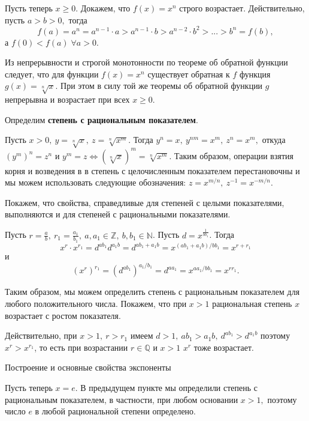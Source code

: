 Пусть теперь $x\geq 0.$
Докажем, что $f(x)=x^n$ строго возрастает.
Действительно, пусть $a>b>0,$ тогда
$$
    f(a)=a^n=a^{n-1} \cdot a > a^{n-1}
    \cdot b > a^{n-2} \cdot b^2 > ... > b^n=f(b),
$$
а $f(0)<f(a)\;\forall a>0.$

Из непрерывности и строгой
монотонности по теореме об обратной функции следует,
что для функции $f(x)=x^n$ существует обратная к $f$
функция $g(x) = \sqrt[n]{x}.$ При этом в силу той же
теоремы об обратной функции $g$ непрерывна и возрастает
при всех $x\geq0.$

Определим \textbf{степень с рациональным показателем}.

Пусть $x>0, \ y = \sqrt[n]x, \ z = \sqrt[n]{x^m}$.
Тогда
$y^n = x, \ y^{nm} = x^m, \ z^n = x^m,$
откуда $(y^m)^n = z^n$ и
$y^m = z \iff (\sqrt[n]x)^m = \sqrt[n]{x^m}.$
Таким образом, операции взятия корня
и возведения в в степень с целочисленным
показателем перестановочны и мы можем использовать
следующие обозначения:
$z = x^{m/n}, \ z^{-1} = x^{-m/n}.$

Покажем, что свойства, справедливые
для степеней с целыми показателями, выполняются
и для степеней с рациональными показателями.

Пусть $r = \frac{a}{b}, \ r_1 = \frac{a_1}{b_1},
    \ a, a_1 \in \mathbb Z, \ b, b_1 \in \mathbb N$.
Пусть $d = x^{\frac{1}{bb_1}}$. Тогда
$$
    x^r \cdot x^{r_1} = d^{ab_1} d^{a_1b} =
    d^{ab_1+a_1b} = x^{(ab_1+a_1b)/bb_1} = x^{r+r_1}
$$
и
$$
    (x^r)^{r_1} = (d^{ab_1})^{a_1/b_1} = d^{aa_1}
    = x^{aa_1/bb_1} = x^{rr_1}.
$$

Таким образом, мы можем определить
степень с рациональным показателем для любого
положительного числа. Покажем, что при
$x>1$ рациональная степень $x$ возрастает
с ростом показателя.

Действительно, при $x>1, \ r>r_1$ имеем
$d>1, \ ab_1>a_1b, \ d^{ab_1}> d^{a_1b}$
поэтому $x^r > x^{r_1}$, то есть при
возрастании $r \in \mathbb Q$ и $x>1$ $x^r$
тоже возрастает.
\begin{center}
    \textsf{Построение и основные свойства экспоненты}
\end{center}

Пусть теперь $x = e$. В предыдущем
пункте мы определили степень с рациональным
показателем, в частности, при любом основании
$x>1,$ поэтому число $e$ в любой рациональной
степени определено.

